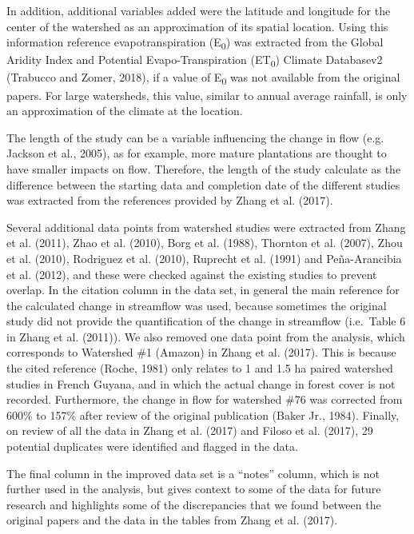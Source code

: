 \documentclass[]{elsarticle} %
\begin{document}
In addition, additional variables added were the latitude and longitude for the center of the watershed as an approximation of its spatial location. Using this information reference evapotranspiration (E\textsubscript{0}) was extracted from the Global Aridity Index and Potential Evapo-Transpiration (ET\textsubscript{0}) Climate Databasev2 (Trabucco and Zomer, 2018), if a value of E\textsubscript{0} was not available from the original papers. For large watersheds, this value, similar to annual average rainfall, is only an approximation of the climate at the location.

The length of the study can be a variable influencing the change in flow (e.g. Jackson et al., 2005), as for example, more mature plantations are thought to have smaller impacts on flow. Therefore, the length of the study calculate as the difference between the starting data and completion date of the different studies was extracted from the references provided by Zhang et al. (2017).

Several additional data points from watershed studies were extracted from Zhang et al. (2011), Zhao et al. (2010), Borg et al. (1988), Thornton et al. (2007), Zhou et al. (2010), Rodriguez et al. (2010), Ruprecht et al. (1991) and Peña-Arancibia et al. (2012), and these were checked against the existing studies to prevent overlap. In the citation column in the data set, in general the main reference for the calculated change in streamflow was used, because sometimes the original study did not provide the quantification of the change in streamflow (i.e.~Table 6 in Zhang et al. (2011)).
We also removed one data point from the analysis, which corresponds to Watershed \#1 (Amazon) in Zhang et al. (2017). This is because the cited reference (Roche, 1981) only relates to 1 and 1.5 ha paired watershed studies in French Guyana, and in which the actual change in forest cover is not recorded. Furthermore, the change in flow for watershed \#76 was corrected from 600\% to 157\% after review of the original publication (Baker Jr., 1984). Finally, on review of all the data in Zhang et al. (2017) and Filoso et al. (2017), 29 potential duplicates were identified and flagged in the data.

The final column in the improved data set is a ``notes'' column, which is not further used in the analysis, but gives context to some of the data for future research and highlights some of the discrepancies that we found between the original papers and the data in the tables from Zhang et al. (2017).
\end{document}
